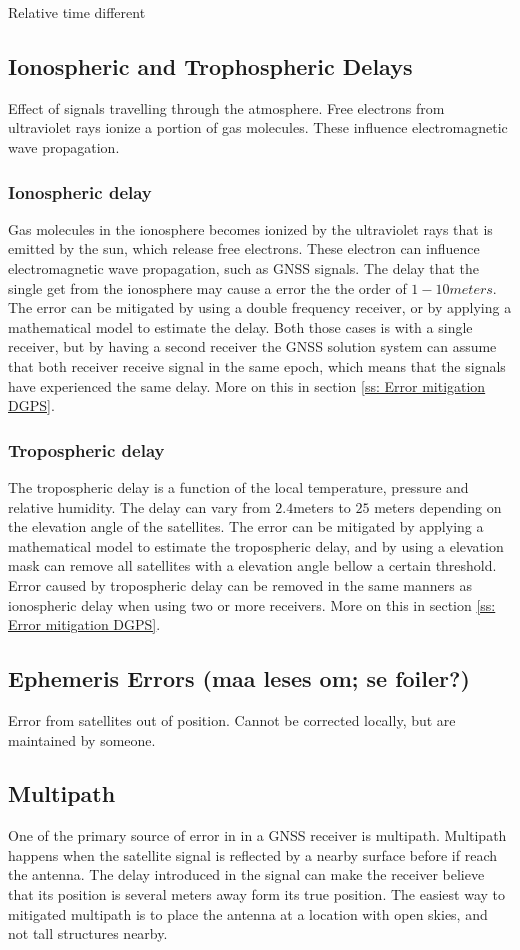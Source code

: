 Relative time different
\subsection{Ionospheric and Trophospheric Delays}
Effect of signals travelling through the atmosphere. Free electrons from ultraviolet rays ionize a portion of gas molecules. These influence electromagnetic wave propagation.
\subsubsection{Ionospheric delay}
Gas molecules in the ionosphere becomes ionized by the ultraviolet rays that is emitted by the sun, which release free electrons. These electron can influence electromagnetic wave propagation, such as GNSS signals. The delay that the single get from the ionosphere may cause a error the the order of $1-10 meters$. The error can be mitigated by using a double frequency receiver, or by applying a mathematical model to estimate the delay. Both those cases is with a single receiver, but by having a second receiver the GNSS solution system can assume that both receiver receive signal in the same epoch, which means that the signals have experienced the same delay. More on this in section \ref{ss: Error mitigation DGPS}.

\subsubsection{Tropospheric delay}
The tropospheric delay is a function of the local temperature, pressure and relative humidity. The delay can vary from $2.4$meters to $25$ meters depending on the elevation angle of the satellites. The error can be mitigated by applying a mathematical model to estimate the tropospheric delay, and by using a elevation mask can remove all satellites with a elevation angle bellow a certain threshold. Error caused by tropospheric delay can be removed in the same manners as ionospheric delay when using two or more receivers. More on this in section \ref{ss: Error mitigation DGPS}.

\subsection{Ephemeris Errors (maa leses om; se foiler?)}
Error from satellites out of position. Cannot be corrected locally, but are maintained by someone.
\subsection{Multipath}
One of the primary source of error in in a GNSS receiver is multipath. Multipath happens when the satellite signal is reflected by a nearby surface before if reach the antenna. The delay introduced in the signal can make the receiver believe that its position is several meters away form its true position. The easiest way to mitigated multipath is to place the antenna at a location with open skies, and not tall structures nearby.
